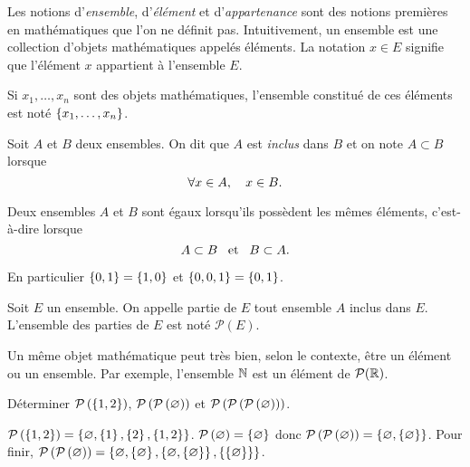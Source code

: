 \documentclass{magnoliaold}
\begin{document}
\begin{definition}[utile=-3]
Les notions d'\emph{ensemble}, d'\emph{élément} et d'\emph{appartenance} sont des notions
premières en mathématiques que l'on ne définit pas. Intuitivement, un ensemble
est une collection d'objets mathématiques appelés éléments. La notation $x\in E$
signifie que l'élément $x$ appartient à l'ensemble $E$.
\end{definition}

\begin{remarqueUnique}
\remarque Si $x_1,\ldots,x_n$ sont des objets mathématiques, l'ensemble
  constitué de ces éléments est noté $\left\{x_1,\ldots,x_n\right\}$.
\end{remarqueUnique}

\begin{definition}[utile=-3]
Soit $A$ et $B$ deux ensembles. On dit que $A$ est \emph{inclus} dans $B$ et on note
$A\subset B$ lorsque
\[\forall x\in A ,\quad x\in B.\]  
\end{definition}

\begin{proposition}[utile=-3]
Deux ensembles $A$ et $B$ sont égaux lorsqu'ils possèdent les mêmes
éléments, c'est-à-dire lorsque
\[A\subset B \quad\!\text{et}\quad\! B\subset A.\]
\end{proposition}

\begin{remarqueUnique}
\remarque En particulier $\left\{0,1\right\}=\left\{1,0\right\}$ et $\left\{0,0,1\right\}=\left\{0,1\right\}$.
\end{remarqueUnique}

\begin{definition}[utile=-3]
Soit $E$ un ensemble. On appelle partie de $E$ tout ensemble $A$ inclus dans $E$.
L'ensemble des parties de $E$ est noté $\mathcal{P}(E)$.
\end{definition}

\begin{remarqueUnique}
\remarque Un même objet mathématique peut très bien, selon le contexte, être un élément
  ou un ensemble. Par exemple, l'ensemble $\mathbb{N}$ est un élément de $\mathcal{P}(\mathbb{R})$.
\end{remarqueUnique}

\begin{exoUnique}
\exo Déterminer $\mathcal{P}\left(\left\{1,2\right\}\right)$,
  $\mathcal{P}\left(\mathcal{P}\left(\varnothing\right)\right)$ et $\mathcal{P}\left(\mathcal{P}\left(\mathcal{P}\left(\varnothing\right)\right)\right)$.
\end{exoUnique}

\begin{sol}
$\mathcal{P}\left(\left\{1,2\right\}\right)=\left\{\varnothing,\left\{1\right\},\left\{2\right\},\left\{1,2\right\}\right\}$. $\mathcal{P}\left(\varnothing\right)=\left\{\varnothing\right\}$ donc $\mathcal{P}\left(\mathcal{P}\left(\varnothing\right)\right)=\left\{\varnothing, \left\{\varnothing\right\}\right\}$. Pour finir, $\mathcal{P}\left(\mathcal{P}\left(\varnothing\right)\right)=\left\{\varnothing,\left\{\varnothing\right\},\left\{\varnothing,\left\{\varnothing\right\}\right\},\left\{\left\{\varnothing\right\}\right\}\right\}$.

\end{sol}
\end{document}
